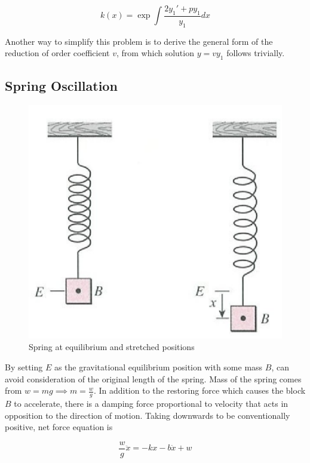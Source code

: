 \begin{equation}
    k(x)=\exp{\int \frac{2y_1'+py_1}{y_1} dx}
\end{equation}

Another way to simplify this problem is to derive the general form of the reduction of order coefficient $v$,
from which solution $y=vy_1$ follows trivially.

\subsection{Spring Oscillation}

\begin{figure}[H]
    \centering
    \includegraphics[scale=0.8]{figures/Screen Shot 2021-12-05 at 5.16.10 PM.png}
    \caption{Spring at equilibrium and stretched positions}
\end{figure}

By setting $E$ as the gravitational equilibrium position with some mass $B$, can avoid consideration of the original length of the spring.
Mass of the spring comes from $w=mg\implies m = \frac{w}{g}$. In addition to the restoring force which causes the block $B$ to accelerate, there is a
damping force proportional to velocity that acts in opposition to the direction of motion. Taking downwards to be conventionally positive, net force equation is

\begin{equation}
    \frac{w}{g}\ddot x=-kx-b\dot x+w
\end{equation}

